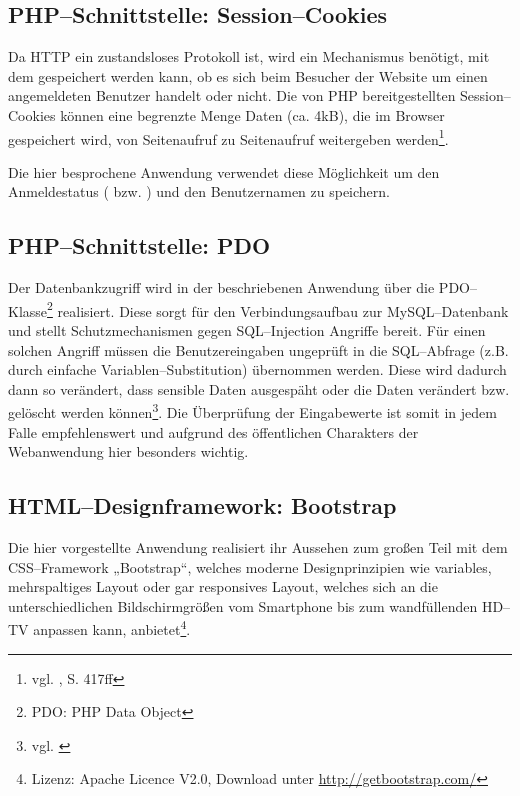 \subsection{PHP--Schnittstelle: Session--Cookies}

Da HTTP ein zustandsloses Protokoll ist, wird ein Mechanismus benötigt, mit dem gespeichert werden kann, ob es sich beim Besucher der Website um einen angemeldeten Benutzer handelt oder nicht. Die von PHP bereitgestellten Session--Cookies können eine begrenzte Menge Daten (ca. 4kB), die im Browser gespeichert wird, von Seitenaufruf zu Seitenaufruf weitergeben werden\footnote{vgl. \cite{Theis}, S. 417ff}.

Die hier besprochene Anwendung verwendet diese Möglichkeit um den Anmeldestatus ( bzw. ) und den Benutzernamen zu speichern.

\subsection{PHP--Schnittstelle: PDO}

Der Datenbankzugriff wird in der beschriebenen Anwendung über die PDO--Klasse\footnote{PDO: PHP Data Object} realisiert. Diese sorgt für den Verbindungsaufbau zur MySQL--Datenbank und stellt Schutzmechanismen gegen SQL--Injection Angriffe bereit. Für einen solchen Angriff müssen die Benutzereingaben ungeprüft in die SQL--Abfrage (z.B. durch einfache Variablen--Substitution) übernommen werden. Diese wird dadurch dann so verändert, dass sensible Daten ausgespäht oder die Daten verändert bzw. gelöscht werden können\footnote{vgl. \cite{friedl:sqlinjection}}. Die Überprüfung der Eingabewerte ist somit in jedem Falle empfehlenswert und aufgrund des öffentlichen Charakters der Webanwendung hier besonders wichtig.

\subsection{HTML--Designframework: Bootstrap}

Die hier vorgestellte Anwendung realisiert ihr Aussehen zum großen Teil mit dem CSS--Framework „Bootstrap“, welches moderne Designprinzipien wie variables, mehrspaltiges Layout oder gar responsives Layout, welches sich an die unterschiedlichen Bildschirmgrößen vom Smartphone bis zum wandfüllenden HD--TV anpassen kann, anbietet\footnote{Lizenz: Apache Licence V2.0, Download unter \url{http://getbootstrap.com/}}.

